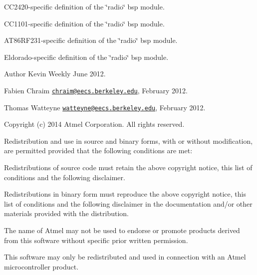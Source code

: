 C\+C2420-\/specific definition of the \char`\"{}radio\char`\"{} bsp module.

C\+C1101-\/specific definition of the \char`\"{}radio\char`\"{} bsp module.

A\+T86\+R\+F231-\/specific definition of the \char`\"{}radio\char`\"{} bsp module.

Eldorado-\/specific definition of the \char`\"{}radio\char`\"{} bsp module.

\begin{DoxyAuthor}{Author}
Kevin Weekly June 2012.

Fabien Chraim \href{mailto:chraim@eecs.berkeley.edu}{\tt chraim@eecs.\+berkeley.\+edu}, February 2012.

Thomas Watteyne \href{mailto:watteyne@eecs.berkeley.edu}{\tt watteyne@eecs.\+berkeley.\+edu}, February 2012.
\end{DoxyAuthor}
Copyright (c) 2014 Atmel Corporation. All rights reserved.

Redistribution and use in source and binary forms, with or without modification, are permitted provided that the following conditions are met\+:


\begin{DoxyEnumerate}
\item Redistributions of source code must retain the above copyright notice, this list of conditions and the following disclaimer.
\item Redistributions in binary form must reproduce the above copyright notice, this list of conditions and the following disclaimer in the documentation and/or other materials provided with the distribution.
\item The name of Atmel may not be used to endorse or promote products derived from this software without specific prior written permission.
\item This software may only be redistributed and used in connection with an Atmel microcontroller product.
\end{DoxyEnumerate}

